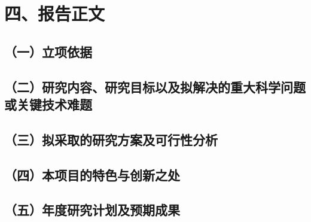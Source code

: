 \documentclass[12pt]{article}
\begin{document}
\section{四、报告正文}
\subsection{（一）立项依据}

\printbibliography[heading=custom]

\subsection{（二）研究内容、研究目标以及拟解决的重大科学问题或关键技术难题}

\subsection{（三）拟采取的研究方案及可行性分析}

\subsection{（四）本项目的特色与创新之处}

\subsection{（五）年度研究计划及预期成果}
\end{document}
